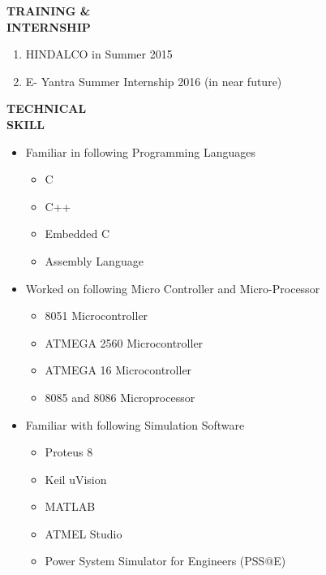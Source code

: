 \documentclass{article}
\begin{document}
\begin{flushleft} 
	\vspace{0.3in}
	\textbf{TRAINING \& \\ INTERNSHIP}
	\begin{enumerate}
		\vspace{-0.44in}
		\addtolength{\itemindent}{1.359in}
		\item  HINDALCO in Summer 2015
		\item  E- Yantra Summer Internship 2016 (in near future)
	\end{enumerate}
\end{flushleft}

 
 \begin{flushleft}
 	\vspace{0.4in}
 	\textbf{TECHNICAL  \\ SKILL}
 	\begin{itemize}
 		\vspace{-0.45in}
 		\addtolength{\itemindent}{1.359in}
 		\item  Familiar in following Programming Languages
 		{\begin{itemize}
 				\addtolength{\itemindent}{1.359in}
 				\item C
 				\item C++
 				\item Embedded C
 				\item Assembly Language
 				
 			\end{itemize}
 		}  
 		\item Worked on following  Micro Controller and Micro-Processor
 		{\begin{itemize}
 				\addtolength{\itemindent}{1.359in}
 				\item 8051 Microcontroller
 				\item ATMEGA 2560 Microcontroller
 				\item ATMEGA 16 Microcontroller
 				\item 8085 and 8086 Microprocessor
 				
 			\end{itemize}
 		} 
 		\item  Familiar with following Simulation Software
 		{\begin{itemize}
 				\addtolength{\itemindent}{1.359in}
 				\item Proteus 8
 				\item Keil uVision
 				\item MATLAB  	
 				\item ATMEL Studio
 				\item Power System Simulator for Engineers (PSS@E)		
 			\end{itemize}
 		} 
 		
 	\end{itemize}
 \end{flushleft}
 
\end{document}
